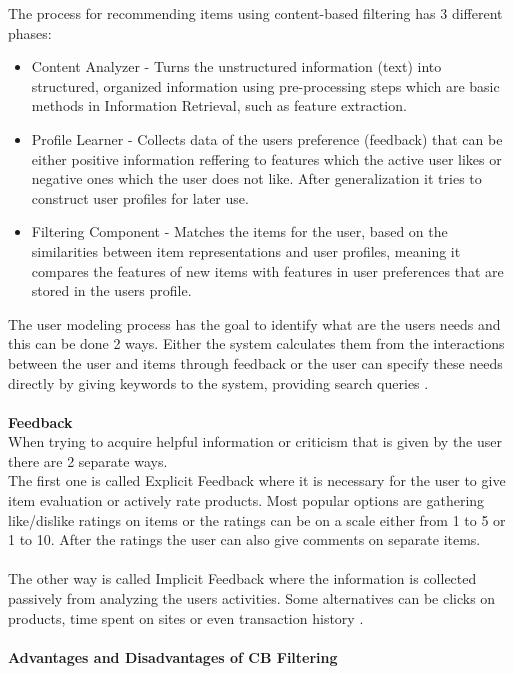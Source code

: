 \documentclass[\myFontSize,oneside,english,hidelinks,a4paper]{article}
\begin{document}
The process for recommending items using content-based filtering has 3 different phases:
\begin{itemize}
\item Content Analyzer - Turns the unstructured information (text) into structured, organized information using pre-processing steps which are basic methods in Information Retrieval, such as feature extraction.
\item Profile Learner - Collects data of the users preference (feedback) that can be either positive information reffering to features which the active user likes or negative ones which the user does not like. After generalization it tries to construct user profiles for later use.
\item Filtering Component - Matches the items for the user, based on the similarities between item representations and user profiles, meaning it compares the features of new items with features in user preferences that are stored in the users profile. \cite{pub.1034486657}
\end{itemize}
%
The user modeling process has the goal to identify what are the users needs and this can be done 2 ways. Either the system calculates them from the interactions between the user and items through feedback or the user can specify these needs directly by giving keywords to the system, providing search queries \cite{Beel2016305}. \\\\
%
%
\textbf{Feedback}\\
When trying to acquire helpful information or criticism that is given by the user there are 2 separate ways. \\
The first one is called Explicit Feedback where it is necessary for the user to give item evaluation or actively rate products. Most popular options are gathering like/dislike ratings on items or the ratings can be on a scale either from 1 to 5 or 1 to 10. After the ratings the user can also give comments on separate items. \\\\
The other way is called Implicit Feedback where the information is collected passively from analyzing the users activities. Some alternatives can be clicks on products, time spent on sites or even transaction history \cite{DeGemmis2015119}.\\\\
%
%
%
\textbf{Advantages and Disadvantages of CB Filtering}
\end{document}
